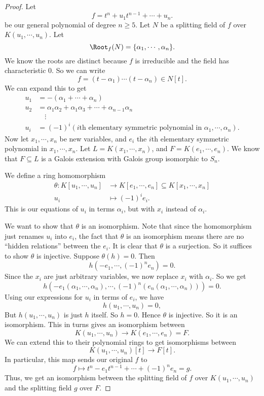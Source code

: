 \documentclass[a4paper]{article}
\begin{document}
\begin{proof}
  Let
  \[
    f = t^n + u_1t^{n - 1} + \cdots + u_n.
  \]
  be our general polynomial of degree $n \geq 5$. Let $N$ be a splitting field of $f$ over $K(u_1, \cdots, u_n)$. Let
  \[
    \Root_f(N) = \{\alpha_1, \cdots, \alpha_n\}.
  \]
  We know the roots are distinct because $f$ is irreducible and the field has characteristic $0$. So we can write
  \[
    f = (t - \alpha_1)\cdots(t - \alpha_n) \in N[t].
  \]
  We can expand this to get
  \begin{align*}
    u_1 &= -(\alpha_1 + \cdots + \alpha_n)\\
    u_2 &= \alpha_1\alpha_2 + \alpha_1\alpha_3 + \cdots + \alpha_{n - 1}\alpha_n\\
    &\quad \vdots\\
    u_i &= (-1)^i (i\text{th elementary symmetric polynomial in }\alpha_1, \cdots, \alpha_n).
  \end{align*}
  Now let $x_1, \cdots, x_n$ be new variables, and $e_i$ the $i$th elementary symmetric polynomial in $x_1, \cdots, x_n$. Let $L = K(x_1, \cdots, x_n)$, and $F = K(e_1, \cdots, e_n)$. We know that $F\subseteq L$ is a Galois extension with Galois group isomorphic to $S_n$.

  We define a ring homomorphism
  \begin{align*}
    \theta: K[u_1, \cdots, u_n] &\to K[e_1, \cdots, e_n] \subseteq K[x_1, \cdots, x_n]\\
    u_i &\mapsto (-1)^i e_i.
  \end{align*}
  This is our equations of $u_i$ in terms $\alpha_i$, but with $x_i$ instead of $\alpha_i$.

  We want to show that $\theta$ is an isomorphism. Note that since the homomorphism just renames $u_i$ into $e_i$, the fact that $\theta$ is an isomorphism means there are no ``hidden relations'' between the $e_i$. It is clear that $\theta$ is a surjection. So it suffices to show $\theta$ is injective. Suppose $\theta(h) = 0$. Then
  \[
    h(-e_1, \cdots, (-1)^n e_n) = 0.
  \]
  Since the $x_i$ are just arbitrary variables, we now replace $x_i$ with $\alpha_i$. So we get
  \[
    h(-e_1(\alpha_1, \cdots, \alpha_n), \cdots, (-1)^n (e_n(\alpha_1, \cdots, \alpha_n))) = 0.
  \]
  Using our expressions for $u_i$ in terms of $e_i$, we have
  \[
    h(u_1, \cdots, u_n) = 0,
  \]
  But $h(u_1, \cdots, u_n)$ is just $h$ itself. So $h = 0$. Hence $\theta$ is injective. So it is an isomorphism. This in turns gives an isomorphism between
  \[
    K(u_1, \cdots, u_n) \to K(e_1, \cdots, e_n) = F.
  \]
  We can extend this to their polynomial rings to get isomorphisms between
  \[
    K(u_1, \cdots, u_n)[t] \to F[t].
  \]
  In particular, this map sends our original $f$ to
  \[
    f \mapsto t^n - e_1 t^{n - 1} + \cdots + (-1)^n e_n = g.
  \]
  Thus, we get an isomorphism between the splitting field of $f$ over $K(u_1, \cdots, u_n)$ and the splitting field $g$ over $F$.


\end{proof}
\end{document}
